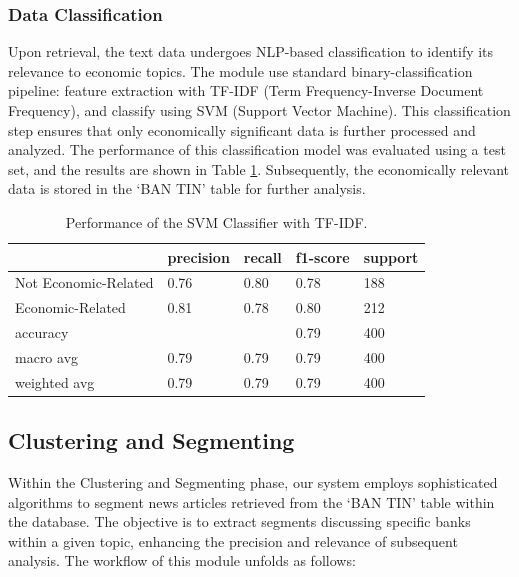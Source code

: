 {\subsubsection{Data Classification}
Upon retrieval, the text data undergoes NLP-based classification to identify its relevance to economic topics. The module use standard binary-classification pipeline: feature extraction with TF-IDF (Term Frequency-Inverse Document Frequency), and classify using SVM (Support Vector Machine). This classification step ensures that only economically significant data is further processed and analyzed. The performance of this classification model was evaluated using a test set, and the results are shown in Table \ref{tab:Classifier result}. Subsequently, the economically relevant data is stored in the `BAN TIN' table for further analysis.

\begin{table}
  \begin{center}
    \begin{tabular}{|l|l|l|l|l|}
      \hline
       & \textbf{precision} & \textbf{recall} & \textbf{f1-score} &\textbf{support}  \\ 
      \hline Not Economic-Related  & 0.76 & 0.80 & 0.78 & 188  \\ 
      \hline Economic-Related & 0.81 & 0.78 & 0.80 & 212 \\ 
      \hline accuracy  &  &  & 0.79 & 400 \\
      \hline macro avg  & 0.79 & 0.79 & 0.79 & 400 \\
      \hline weighted avg  & 0.79 & 0.79 & 0.79 & 400 \\
      \hline
    \end{tabular}%
  \end{center}
  \caption{\small Performance of the SVM Classifier with TF-IDF.}
  \label{tab:Classifier result}
\end{table}

\subsection{Clustering and Segmenting}
Within the Clustering and Segmenting phase, our system employs sophisticated algorithms to segment news articles retrieved from the `BAN TIN' table within the database. The objective is to extract segments discussing specific banks within a given topic, enhancing the precision and relevance of subsequent analysis. The workflow of this module unfolds as follows:

}
